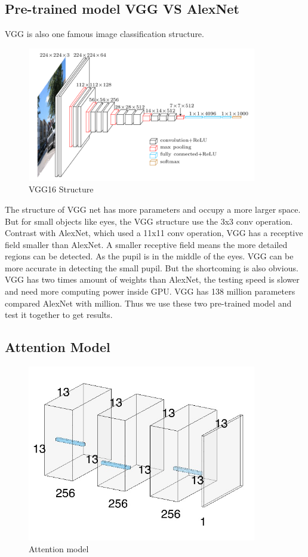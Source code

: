 \documentclass[senior]{IPSstyle}
\begin{document}
\subsection{Pre-trained model VGG VS AlexNet}
VGG is also one famous image classification structure\cite{simonyan2014very}.
\begin{figure}[h]
    \centering
    \includegraphics[width=10cm]{MasterThesis-master/images/vgg16.png}
    \caption{VGG16 Structure}
    \label{fig:VGG16}
\end{figure}
The structure of VGG net has more parameters and occupy a more larger space.
But for small objects like eyes, the VGG structure use the 3x3 conv operation.
Contrast with AlexNet, which used a 11x11 conv operation, VGG has a receptive field smaller than AlexNet.
A smaller receptive field means the more detailed regions can be detected.
As the pupil is in the middle of the eyes.
VGG can be more accurate in detecting the small pupil.
But the shortcoming is also obvious.
VGG has two times amount of weights than AlexNet, the testing speed is slower and need more computing power inside GPU.
VGG has 138 million parameters compared  AlexNet with million.
Thus we use these two pre-trained model and test it together to get results.


\subsection{Attention Model}\label{cha: attention model}
\begin{figure}[h]
    \centering
    \includegraphics[width=10cm]{MasterThesis-master/images/attension.jpg}
    \caption{Attention model}
    \label{fig:attention model}
\end{figure}
\end{document}
